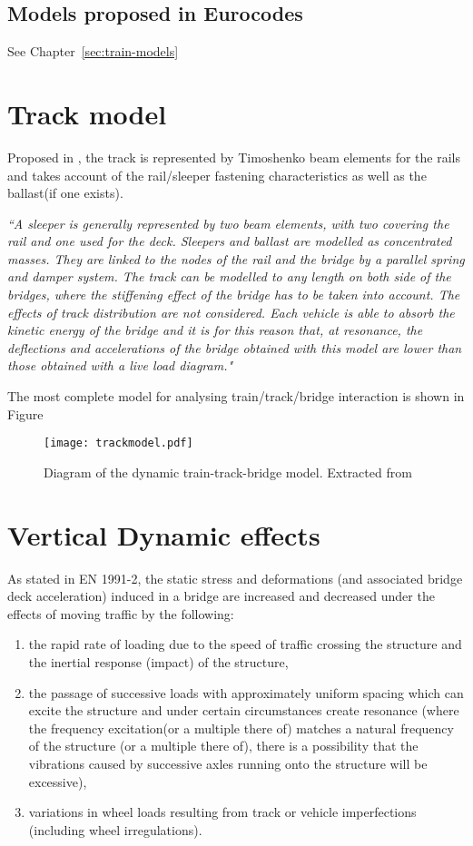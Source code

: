 \subsection{Models proposed in Eurocodes}

See Chapter~\ref{sec:train-models}

\section{Track model}
Proposed in \cite[A.6.1.3]{uic}, the track is represented by Timoshenko beam elements for the rails and takes account of the rail/sleeper fastening characteristics as well as the ballast(if one exists).

\textit{``A sleeper is generally represented by two beam elements, with two covering the rail and one used for the deck. Sleepers and ballast are modelled as concentrated masses. They are linked to the nodes of the rail and the bridge by a parallel spring and damper system. The track can be modelled to any length on both side of the bridges, where the stiffening effect of the bridge has to be taken into account. The effects of track distribution are not considered. Each vehicle is able to absorb the kinetic energy of the bridge and it is for this reason that, at resonance, the deflections and accelerations of the bridge obtained with this model are lower than those obtained with a live load diagram."}

The most complete model for analysing train/track/bridge interaction is shown in Figure

\begin{figure}[h]
	\centering
	\texttt{[image: trackmodel.pdf]}
	\caption{Diagram of the dynamic train-track-bridge model. Extracted from \cite[Fig. 15]{uic}}
	\label{fig:trackmodel}
\end{figure}



\section{Vertical Dynamic effects}
As stated in EN 1991-2\cite{EC12}, the static stress and deformations (and associated bridge deck acceleration) induced in a bridge are increased and decreased under the effects of moving traffic by the following:

\begin{enumerate}[-]
	\item the rapid rate of loading due to the speed of traffic crossing the structure and the inertial response (impact) of the structure,
	\item the passage of successive loads with approximately uniform spacing which can excite the structure and under certain circumstances create resonance (where the frequency excitation(or a multiple there of) matches a natural frequency of the structure (or a multiple there of), there is a possibility that the vibrations caused by successive axles running onto the structure will be excessive),
	\item variations in wheel loads resulting from track or vehicle imperfections (including wheel irregulations).
\end{enumerate}

